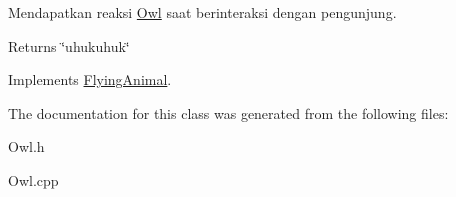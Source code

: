 Mendapatkan reaksi \hyperlink{classOwl}{Owl} saat berinteraksi dengan pengunjung. 

\begin{DoxyReturn}{Returns}
\char`\"{}uhukuhuk\char`\"{} 
\end{DoxyReturn}


Implements \hyperlink{classFlyingAnimal_ac0eee625fa2235eee8cbdc0a010ae430}{Flying\-Animal}.



The documentation for this class was generated from the following files\-:\begin{DoxyCompactItemize}
\item 
Owl.\-h\item 
Owl.\-cpp\end{DoxyCompactItemize}
